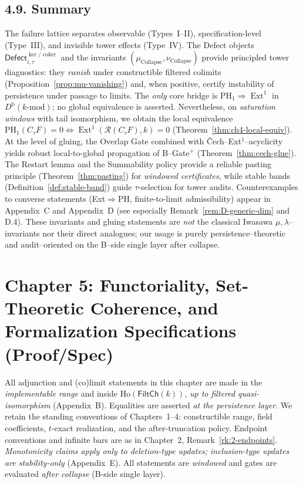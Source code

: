 \documentclass[11pt]{article}
\numberwithin{equation}{section}
\theoremstyle{plain}
\theoremstyle{definition}
\theoremstyle{remark}
\DeclareMathOperator{\Ext}{Ext}
\DeclareRobustCommand{\hyp}{\nobreakdash-}
\theoremstyle{plain}
\theoremstyle{definition}
\numberwithin{equation}{section}
\theoremstyle{definition}
\DeclareRobustCommand{\muc}{\mu_{\mathrm{Collapse}}}
\DeclareRobustCommand{\nuc}{\nu_{\mathrm{Collapse}}}
\numberwithin{equation}{section}
\theoremstyle{plain}
\theoremstyle{definition}
\theoremstyle{remark}
\DeclareMathOperator{\coker}{coker} %
\providecommand{\Defect}{\mathsf{Defect}}
\providecommand{\muc}{\mu_{\mathrm{Collapse}}}
\providecommand{\nuc}{\nu_{\mathrm{Collapse}}}
\begin{document}
\subsection*{4.9. Summary}
The failure lattice separates observable (Types~I–II), specification-level (Type~III), and invisible tower effects (Type~IV). The Defect objects $\Defect_{i,\tau}^{\ker/\coker}$ and the invariants $(\muc,\nuc)$ provide principled tower diagnostics: they \emph{vanish} under constructible filtered colimits (Proposition~\ref{prop:mu-vanishing}) and, when positive, certify instability of persistence under passage to limits. The \emph{only} core bridge is $\mathrm{PH}_1\Rightarrow \Ext^1$ in $D^{\mathrm{b}}(k\text{-mod})$; no global equivalence is asserted. Nevertheless, on \emph{saturation windows} with tail isomorphism, we obtain the local equivalence $\mathrm{PH}_1(C_\tau F)=0 \Leftrightarrow \Ext^1(\mathcal{R}(C_\tau F),k)=0$ (Theorem~\ref{thm:ch4-local-equiv}). At the level of gluing, the Overlap Gate combined with Čech–Ext$^1$–acyclicity yields robust local-to-global propagation of B–Gate$^{+}$ (Theorem~\ref{thm:cech-glue}). The Restart lemma and the Summability policy provide a reliable pasting principle (Theorem~\ref{thm:pasting}) for \emph{windowed certificates}, while stable bands (Definition~\ref{def:stable-band}) guide $\tau$-selection for tower audits. Counterexamples to converse statements (Ext$\Rightarrow$PH, finite-to-limit admissibility) appear in Appendix~C and Appendix~D (see especially Remark~\ref{rem:D-generic-dim} and D.4). These invariants and gluing statements are \emph{not} the classical Iwasawa $\mu,\lambda$–invariants nor their direct analogues; our usage is purely persistence–theoretic and audit–oriented on the B–side single layer after collapse.



\section{Chapter 5: Functoriality, Set-Theoretic Coherence, and Formalization Specifications (Proof/Spec)}

All adjunction and (co)limit statements in this chapter are made in the \emph{implementable range} and inside
$\mathrm{Ho}(\mathsf{FiltCh}(k))$, \emph{up to filtered quasi\hyp isomorphism} (Appendix~B). Equalities are asserted \emph{at the persistence layer}. We retain the standing conventions of Chapters~1–4: constructible range, field coefficients, $t$-exact realization, and the after\hyp truncation policy. Endpoint conventions and infinite bars are as in Chapter~2, Remark~\ref{rk:2-endpoints}. \emph{Monotonicity claims apply only to deletion\hyp type updates; inclusion\hyp type updates are stability\hyp only} (Appendix~E). All statements are \emph{windowed} and gates are evaluated \emph{after collapse} (B-side single layer).
\end{document}
